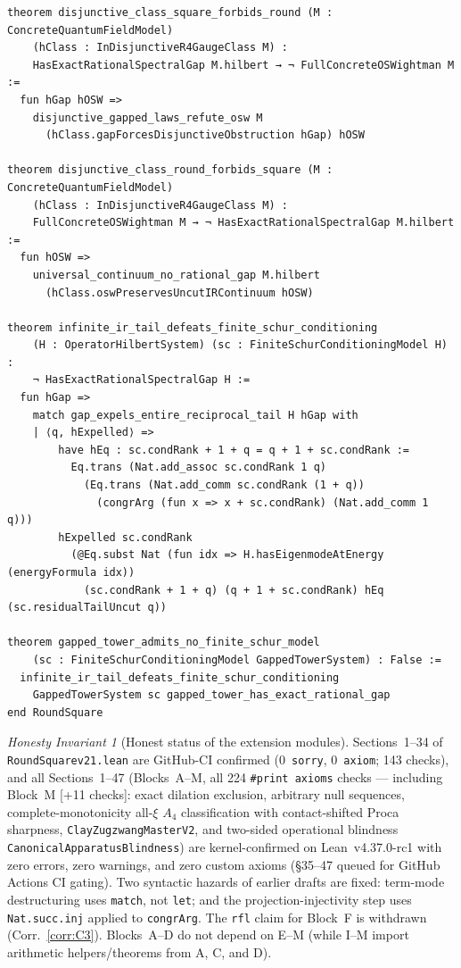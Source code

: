 \documentclass[11pt,a4paper]{article}
\theoremstyle{plain}
\theoremstyle{definition}
\theoremstyle{remark}
\newtheorem{invariant}[theorem]{Honesty Invariant}
\renewcommand{\_}{\oldunderscore\allowbreak}
\newcommand{\Lean}[1]{\texttt{\small #1}}
\begin{document}
\begin{lstlisting}
theorem disjunctive_class_square_forbids_round (M : ConcreteQuantumFieldModel)
    (hClass : InDisjunctiveR4GaugeClass M) :
    HasExactRationalSpectralGap M.hilbert → ¬ FullConcreteOSWightman M :=
  fun hGap hOSW =>
    disjunctive_gapped_laws_refute_osw M
      (hClass.gapForcesDisjunctiveObstruction hGap) hOSW

theorem disjunctive_class_round_forbids_square (M : ConcreteQuantumFieldModel)
    (hClass : InDisjunctiveR4GaugeClass M) :
    FullConcreteOSWightman M → ¬ HasExactRationalSpectralGap M.hilbert :=
  fun hOSW =>
    universal_continuum_no_rational_gap M.hilbert
      (hClass.oswPreservesUncutIRContinuum hOSW)

theorem infinite_ir_tail_defeats_finite_schur_conditioning
    (H : OperatorHilbertSystem) (sc : FiniteSchurConditioningModel H) :
    ¬ HasExactRationalSpectralGap H :=
  fun hGap =>
    match gap_expels_entire_reciprocal_tail H hGap with
    | ⟨q, hExpelled⟩ =>
        have hEq : sc.condRank + 1 + q = q + 1 + sc.condRank :=
          Eq.trans (Nat.add_assoc sc.condRank 1 q)
            (Eq.trans (Nat.add_comm sc.condRank (1 + q))
              (congrArg (fun x => x + sc.condRank) (Nat.add_comm 1 q)))
        hExpelled sc.condRank
          (@Eq.subst Nat (fun idx => H.hasEigenmodeAtEnergy (energyFormula idx))
            (sc.condRank + 1 + q) (q + 1 + sc.condRank) hEq (sc.residualTailUncut q))

theorem gapped_tower_admits_no_finite_schur_model
    (sc : FiniteSchurConditioningModel GappedTowerSystem) : False :=
  infinite_ir_tail_defeats_finite_schur_conditioning
    GappedTowerSystem sc gapped_tower_has_exact_rational_gap
end RoundSquare
\end{lstlisting}

\begin{invariant}[Honest status of the extension modules]
Sections~1--34 of \texttt{RoundSquare\_v21.lean} are GitHub-CI confirmed (0~\texttt{sorry}, 0~\texttt{axiom}; 143 checks), and all Sections~1--47 (Blocks~A--M, all 224 \texttt{\#print axioms} checks --- including Block~M [+11 checks]: exact dilation exclusion, arbitrary null sequences, complete-monotonicity all-$\xi$ $A_4$ classification with contact-shifted Proca sharpness, \Lean{ClayZugzwangMasterV2}, and two-sided operational blindness \Lean{CanonicalApparatusBlindness}) are kernel-confirmed on Lean~v4.37.0-rc1 with zero errors, zero warnings, and zero custom axioms (\S35--47 queued for GitHub Actions CI gating). Two syntactic hazards of earlier drafts are fixed: term-mode destructuring uses \texttt{match}, not \texttt{let}; and the projection-injectivity step uses \Lean{Nat.succ.inj} applied to \Lean{congrArg}. The \texttt{rfl} claim for Block~F is withdrawn (Corr.~\ref{corr:C3}). Blocks~A--D do not depend on E--M (while I--M import arithmetic helpers/theorems from A, C, and D).
\end{invariant}
\end{document}
